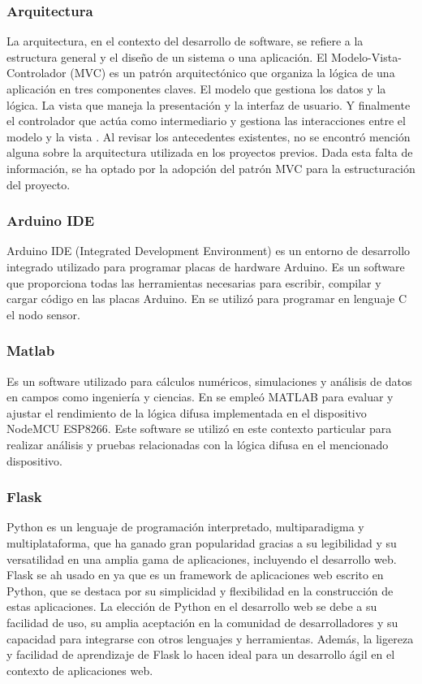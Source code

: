 \subsubsection*{Arquitectura}
La arquitectura, en el contexto del desarrollo de software, se refiere a la estructura general y el diseño de un sistema o una aplicación. El Modelo-Vista-Controlador (MVC) es un patrón arquitectónico que organiza la lógica de una aplicación en tres componentes claves. El modelo que gestiona los datos y la lógica. La vista que maneja la presentación y la interfaz de usuario. Y finalmente el controlador que actúa como intermediario y gestiona las interacciones entre el modelo y la vista \cite{bascon_pantoja_patron_2004}. Al revisar los antecedentes existentes, no se encontró mención alguna sobre la arquitectura utilizada en los proyectos previos. Dada esta falta de información, se ha optado por la adopción del patrón MVC para la estructuración del proyecto.

\subsubsection*{Arduino IDE}
Arduino IDE (Integrated Development Environment) es un entorno de desarrollo integrado utilizado para programar placas de hardware Arduino. Es un software que proporciona todas las herramientas necesarias para escribir, compilar y cargar código en las placas Arduino. En \cite{widyawati_fuzzy_2022} se utilizó para programar en lenguaje C el nodo sensor.

\subsubsection*{Matlab}
Es un software utilizado para cálculos numéricos, simulaciones y análisis de datos en campos como ingeniería y ciencias. En \cite{widyawati_fuzzy_2022} se empleó MATLAB para evaluar y ajustar el rendimiento de la lógica difusa implementada en el dispositivo NodeMCU ESP8266. Este software se utilizó en este contexto particular para realizar análisis y pruebas relacionadas con la lógica difusa en el mencionado dispositivo.

\subsubsection*{Flask}
Python es un lenguaje de programación interpretado, multiparadigma y multiplataforma, que ha ganado gran popularidad gracias a su legibilidad y su versatilidad en una amplia gama de aplicaciones, incluyendo el desarrollo web. Flask se ah usado en \cite{noauthor_fuzzy_2023} ya que es un framework de aplicaciones web escrito en Python, que se destaca por su simplicidad y flexibilidad en la construcción de estas aplicaciones. La elección de Python en el desarrollo web se debe a su facilidad de uso, su amplia aceptación en la comunidad de desarrolladores y su capacidad para integrarse con otros lenguajes y herramientas. Además, la ligereza y facilidad de aprendizaje de Flask lo hacen ideal para un desarrollo ágil en el contexto de aplicaciones web.

